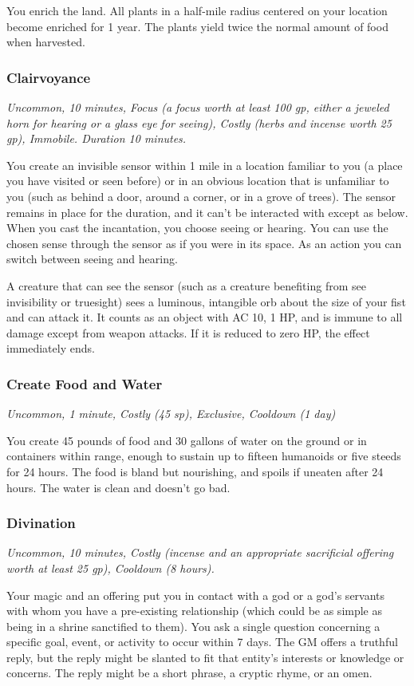 You enrich the land. All plants in a half-mile radius centered on your location become enriched for 1 year. The plants yield twice the normal amount of food when harvested.

\subsubsection{Clairvoyance}
\textit{Uncommon, 10 minutes, Focus (a focus worth at least 100 gp, either a jeweled horn for hearing or a glass eye for seeing), Costly (herbs and incense worth 25 gp), Immobile. Duration 10 minutes.}

You create an invisible sensor within 1 mile in a location familiar to you (a place you have visited or seen before) or in an obvious location that is unfamiliar to you (such as behind a door, around a corner, or in a grove of trees). The sensor remains in place for the duration, and it can't be interacted with except as below.
When you cast the incantation, you choose seeing or hearing. You can use the chosen sense through the sensor as if you were in its space. As an action you can switch between seeing and hearing.

A creature that can see the sensor (such as a creature benefiting from see invisibility or truesight) sees a luminous, intangible orb about the size of your fist and can attack it. It counts as an object with AC 10, 1 HP, and is immune to all damage except from weapon attacks. If it is reduced to zero HP, the effect immediately ends.

\subsubsection{Create Food and Water}
\textit{Uncommon, 1 minute, Costly (45 sp), Exclusive, Cooldown (1 day)}

You create 45 pounds of food and 30 gallons of water on the ground or in containers within range, enough to sustain up to fifteen humanoids or five steeds for 24 hours. The food is bland but nourishing, and spoils if uneaten after 24 hours. The water is clean and doesn't go bad.

\subsubsection{Divination}
\textit{Uncommon, 10 minutes, Costly (incense and an appropriate sacrificial offering worth at least 25 gp), Cooldown (8 hours).}

Your magic and an offering put you in contact with a god or a god's servants with whom you have a pre-existing relationship (which could be as simple as being in a shrine sanctified to them). You ask a single question concerning a specific goal, event, or activity to occur within 7 days. The GM offers a truthful reply, but the reply might be slanted to fit that entity's interests or knowledge or concerns. The reply might be a short phrase, a cryptic rhyme, or an omen.

